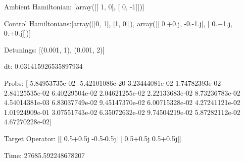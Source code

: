 \documentclass{article}
\begin{document}
    

\newpage

Ambient Hamiltonian: [array([[ 1,  0],
       [ 0, -1]])]

Control Hamiltonians:[array([[0, 1],
       [1, 0]]), array([[ 0.+0.j, -0.-1.j],
       [ 0.+1.j,  0.+0.j]])]

Detunings: [(0.001, 1), (0.001, 2)]

 dt: 0.031415926535897934

Probs: [  5.84953735e-02  -5.42101086e-20   3.23444081e-02   1.74782393e-02
   2.84125535e-02   6.40229504e-02   2.04621255e-02   2.22133683e-02
   8.73236783e-02   4.54014381e-03   6.83037749e-02   9.45147370e-02
   6.00715328e-02   4.27241121e-02   1.01924909e-01   3.07551743e-02
   6.35072632e-02   9.74504219e-02   5.87282112e-02   4.67270228e-02]

Target Operator: [[ 0.5+0.5j -0.5-0.5j]
 [ 0.5+0.5j  0.5+0.5j]]

Time: 27685.592248678207
\end{document}
